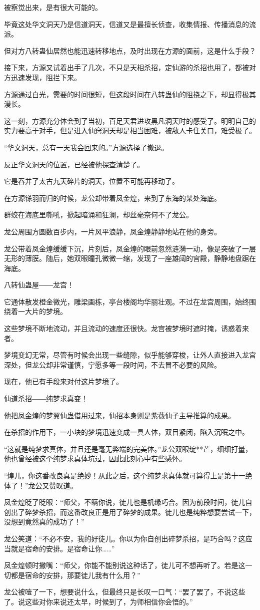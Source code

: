 \begin{this_body}
被察觉出来，是有很大可能的。

毕竟这处华文洞天乃是信道洞天，信道又是最擅长侦查，收集情报、传播消息的流派。

但对方八转蛊仙居然也能迅速转移地点，及时出现在方源的面前，这是什么手段？

接下来，方源又试着出手了几次，不只是天相杀招，定仙游的杀招也用了，都被对方迅速发现，阻拦下来。

方源通过白光，需要的时间很短，但这段时间在八转蛊仙的阻挠之下，却显得极其漫长。

这一刻，方源充分体会到了当初，百足天君进攻黑凡洞天时的感受了。明明自己的实力要高于对手，但是进入仙窍洞天却是相当困难，被敌人卡住关口，难受极了。

“华文洞天，总有一天我会回来的。”方源选择了撤退。

反正华文洞天的位置，已经被他探查清楚了。

它是吞并了太古九天碎片的洞天，位置不可能再移动了。

在方源铩羽而归的时候，龙公却带着凤金煌，来到了东海的某处海底。

群蛟在海底里嘶吼，掀起暗涌和狂澜，却丝毫奈何不了龙公。

龙公周围方圆数百步内，一片风平浪静，凤金煌静静地站在他的身旁。

龙公带着凤金煌缓缓下沉，片刻后，凤金煌的眼前忽然涟漪一动，像是突破了一层无形的薄膜。随后，她双眼瞳孔微微一缩，发现了一座雄阔的宫殿，静静地盘踞在海底。

八转仙蛊屋――龙宫！

它通体散发橙金微光，雕梁画栋，亭台楼阁均华丽壮观。不过在龙宫周围，始终围绕着一大片的梦境。

这些梦境不断地流动，并且流动的速度还很快。龙宫被梦境时遮时掩，诱惑着来者。

梦境变幻无常，尽管有时候会出现一些缝隙，似乎能够穿梭，让外人直接进入龙宫深处，但龙公却非常谨慎，宁愿多等一段时间，不去冒不必要的风险。

现在，他已有手段来对付这片梦境了。

仙道杀招――纯梦求真变！

他把凤金煌的梦翼仙蛊借用过来，仙招本身则是紫薇仙子主导推算的成果。

在杀招的作用下，一小块的梦境迅速变成一具人体，双目紧闭，陷入沉眠之中。

“这就是纯梦求真体，并且还是毫无弊端的完美体。”龙公双眼绽**芒，细细打量，他也曾经被这个纯梦求真体坑过，因此此刻心中有些感怀。

“煌儿，你这番改良真是绝妙！从此之后，这个纯梦求真体就可算得上是第十一绝体了！”龙公又赞叹道。

凤金煌眨了眨眼：“师父，不瞒你说，徒儿也是机缘巧合。因为前段时间，徒儿自创出了碎梦杀招，而这番改良正是用了碎梦的成果。徒儿也是纯粹想要尝试一下，没想到竟然真的成功了！”

龙公笑道：“不必不安，我的好徒儿。你以为你自创出碎梦杀招，是巧合吗？这应当就是宿命的安排。是宿命让你……”

凤金煌顿时撇嘴：“师父，你能不能别说这种话了，徒儿可不想再听了。若是这一切都是宿命的安排，那要徒儿我有什么用？”

龙公被噎了一下，想要说什么，但最终只是长叹一口气：“罢了罢了，不说这些了。说这些对你来说还太早，时候到了，为师相信你会悟的。”

\end{this_body}

